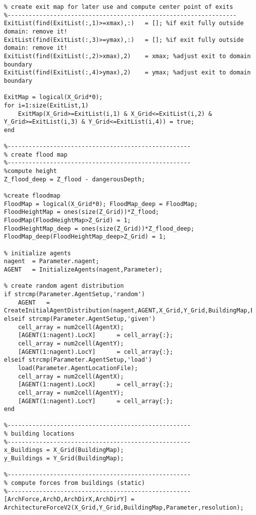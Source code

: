\begin{lstlisting}[breaklines]
%-----------------------------------------------------------------
% create exit map for later use and compute center point of exits
%-----------------------------------------------------------------
ExitList(find(ExitList(:,1)>=xmax),:)   = []; %if exit fully outside domain: remove it!
ExitList(find(ExitList(:,3)>=ymax),:)   = []; %if exit fully outside domain: remove it!
ExitList(find(ExitList(:,2)>xmax),2)    = xmax; %adjust exit to domain boundary
ExitList(find(ExitList(:,4)>ymax),2)    = ymax; %adjust exit to domain boundary

ExitMap = logical(X_Grid*0);
for i=1:size(ExitList,1)
    ExitMap(X_Grid>=ExitList(i,1) & X_Grid<=ExitList(i,2) & Y_Grid>=ExitList(i,3) & Y_Grid<=ExitList(i,4)) = true;
end

%----------------------------------------------------
% create flood map
%----------------------------------------------------
%compute height
Z_flood_deep = Z_flood - dangerousDepth;

%create floodmap
FloodMap = logical(X_Grid*0); FloodMap_deep = FloodMap;
FloodHeightMap = ones(size(Z_Grid))*Z_flood;
FloodMap(FloodHeightMap>Z_Grid) = 1;
FloodHeightMap_deep = ones(size(Z_Grid))*Z_flood_deep;
FloodMap_deep(FloodHeightMap_deep>Z_Grid) = 1;

% initialize agents
nagent  = Parameter.nagent;
AGENT   = InitializeAgents(nagent,Parameter);

% create random agent distribution
if strcmp(Parameter.AgentSetup,'random')
    AGENT   = CreateInitialAgentDistribution(nagent,AGENT,X_Grid,Y_Grid,BuildingMap,BoundaryMap,StartArea,ExitMap);
elseif strcmp(Parameter.AgentSetup,'given')
    cell_array = num2cell(AgentX);
    [AGENT(1:nagent).LocX]      = cell_array{:};
    cell_array = num2cell(AgentY);
    [AGENT(1:nagent).LocY]      = cell_array{:};
elseif strcmp(Parameter.AgentSetup,'load')
    load(Parameter.AgentLocationFile);
    cell_array = num2cell(AgentX);
    [AGENT(1:nagent).LocX]      = cell_array{:};
    cell_array = num2cell(AgentY);
    [AGENT(1:nagent).LocY]      = cell_array{:};
end

%----------------------------------------------------
% building locations
%----------------------------------------------------
x_Buildings = X_Grid(BuildingMap);
y_Buildings = Y_Grid(BuildingMap);

%----------------------------------------------------
% compute forces from buildings (static)
%----------------------------------------------------
[ArchForce,ArchD,ArchDirX,ArchDirY] = ArchitectureForceV2(X_Grid,Y_Grid,BuildingMap,Parameter,resolution);





\end{lstlisting}
